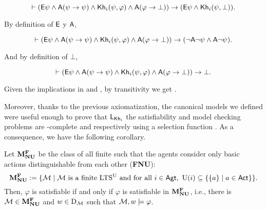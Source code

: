 \begin{equation*}
\vdash ({\sf E}\psi \wedge {\sf A}(\psi \rightarrow \psi) \wedge {\sf Kh}_i(\psi,\varphi) \wedge {\sf A}(\varphi \rightarrow \bot)) \rightarrow ({\sf E}\psi \wedge {\sf Kh}_i(\psi,\bot)).
\end{equation*}

By definition of ${\sf E}$ y ${\sf A}$,

\begin{equation*}
\vdash ({\sf E}\psi \wedge {\sf A}(\psi \rightarrow \psi) \wedge {\sf Kh}_i(\psi,\varphi) \wedge {\sf A}(\varphi \rightarrow \bot)) \rightarrow (\neg{\sf A}\neg\psi \wedge {\sf A}\neg\psi).
\end{equation*}

And by definition of $\bot$,

\begin{equation}\label{eq:khe2}
\vdash ({\sf E}\psi \wedge {\sf A}(\psi \rightarrow \psi) \wedge {\sf Kh}_i(\psi,\varphi) \wedge {\sf A}(\varphi \rightarrow \bot)) \rightarrow \bot.
\end{equation}

Given the implications in  and , by transitivity we get .

 Moreover, thanks to the previous axiomatization, the canonical models we defined were useful enough to prove that $\mathsf{L}_{{\sf Kh}_i}$ the satisfiability and model checking problems are \NP-complete and \Poly respectively using a selection function \cite{AFSVQ21,AFSVQ23report}. As a consequence, we have the following corollary.

\medskip

\begin{corollary}\label{cor:satcultsker}
Let $\mathbf{M}^{\mathbf{F}}_{\mathbf{NU}} $ be the class of all finite \ultss such that the agents consider only basic actions distinguishable from each other (\textbf{FNU}): 
\[
\cultsfnu := \setof{\modults}{\modults \text{ is a finite \ults and for all } i \in \AGT,\ \Unc(i) \subseteq  \setof{\set{a}}{a \in \ACT}}.
\]
Then, $\varphi$ is satisfiable if and only if $\varphi$ is satisfiable in $\mathbf{M}^{\mathbf{F}}_{\mathbf{NU}}$, i.e., there is $\mathcal{M} \in \mathbf{M}^{\mathbf{F}}_{\mathbf{NU}}$ and $w \in \operatorname{D}_{\mathcal{M}}$ such that $\mathcal{M},w \models \varphi$.
\end{corollary}

\medskip